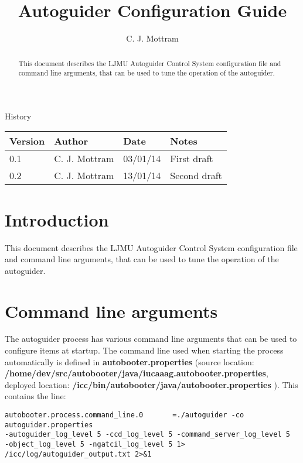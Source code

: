 \documentclass[10pt,a4paper]{article}
\title{Autoguider Configuration Guide}
\author{C. J. Mottram}
\date{}
\begin{document}
\thispagestyle{empty}
\maketitle
\begin{abstract}
This document describes the LJMU Autoguider Control System configuration file and command line arguments, that can be used to tune the operation of the autoguider.
\end{abstract}
\centerline{\Large History}
\begin{center}
\begin{tabular}{|l|l|l|p{15em}|}
\hline
{\bf Version} & {\bf Author} & {\bf Date} & {\bf Notes} \\
\hline
0.1 & C. J. Mottram & 03/01/14 & First draft \\
0.2 & C. J. Mottram & 13/01/14 & Second draft \\
\hline
\end{tabular}
\end{center}

\newpage
\tableofcontents
\listoffigures
\listoftables
\newpage

\section{Introduction}

This document describes the LJMU Autoguider Control System configuration file and command line arguments, that can be used to tune the operation of the autoguider.

\section{Command line arguments}

The autoguider process has various command line arguments that can be used to configure items at startup. The command
line used when starting the process automatically is defined in {\bf autobooter.properties} (source location: {\bf /home/dev/src/autobooter/java/iucaaag.autobooter.properties}, deployed location: {\bf /icc/bin/autobooter/java/autobooter.properties} ). This contains the line:

\begin{verbatim}
autobooter.process.command_line.0       =./autoguider -co autoguider.properties 
-autoguider_log_level 5 -ccd_log_level 5 -command_server_log_level 5 
-object_log_level 5 -ngatcil_log_level 5 1> /icc/log/autoguider_output.txt 2>&1
\end{verbatim}
\end{document}

